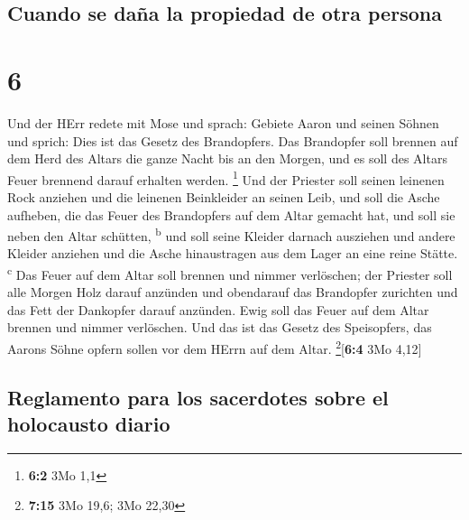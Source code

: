 \hypertarget{cuando-se-dauxf1a-la-propiedad-de-otra-persona}{%
\subsection{Cuando se daña la propiedad de otra
persona}\label{cuando-se-dauxf1a-la-propiedad-de-otra-persona}}

\hypertarget{section-5}{%
\section{6}\label{section-5}}

 Und der HErr redete mit Mose und sprach: 
Gebiete Aaron und seinen Söhnen und sprich: Dies ist das Gesetz des
Brandopfers. Das Brandopfer soll brennen auf dem Herd des Altars die
ganze Nacht bis an den Morgen, und es soll des Altars Feuer brennend
darauf erhalten werden. \footnote{\textbf{6:2} 3Mo 1,1} 
Und der Priester soll seinen leinenen Rock anziehen und die leinenen
Beinkleider an seinen Leib, und soll die Asche aufheben, die das Feuer
des Brandopfers auf dem Altar gemacht hat, und soll sie neben den Altar
schütten, \textsuperscript{b}  und soll seine Kleider
darnach ausziehen und andere Kleider anziehen und die Asche hinaustragen
aus dem Lager an eine reine Stätte. \textsuperscript{c} 
Das Feuer auf dem Altar soll brennen und nimmer verlöschen; der Priester
soll alle Morgen Holz darauf anzünden und obendarauf das Brandopfer
zurichten und das Fett der Dankopfer darauf anzünden. 
Ewig soll das Feuer auf dem Altar brennen und nimmer verlöschen.
 Und das ist das Gesetz des Speisopfers, das Aarons Söhne
opfern sollen vor dem HErrn auf dem Altar. \footnote{\textbf{7:15} 3Mo
  19,6; 3Mo 22,30}{[}\textbf{6:4} 3Mo 4,12{]}

\hypertarget{reglamento-para-los-sacerdotes-sobre-el-holocausto-diario}{%
\subsection{Reglamento para los sacerdotes sobre el holocausto
diario}\label{reglamento-para-los-sacerdotes-sobre-el-holocausto-diario}}

